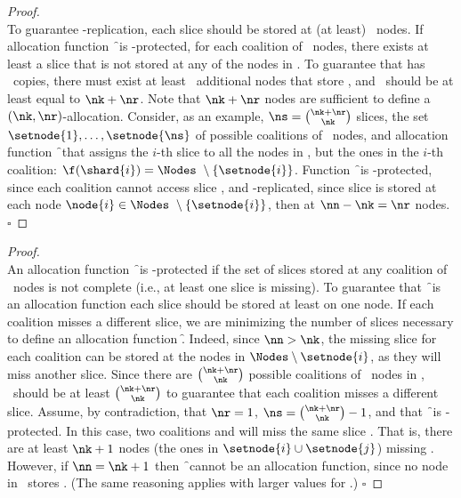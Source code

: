 \begin{proof}
	\hfill\\
	To guarantee \nr-replication, each slice should be stored at
    (at least) \nr\ nodes. If allocation function \f\ is
    \nk-protected, for each coalition  of \nk\ nodes,
    there exists at least a slice  that is not stored at
    any of the nodes in . To guarantee that 
    has \nr\ copies, there must exist at least \nr\ additional
    nodes that store , and \nn\ should be at least equal
    to $\nk + \nr$.  Note that $\nk + \nr$ nodes are sufficient to
    define a $(\nk,\nr)$-allocation.  Consider, as an example,
    $\ns=\binom{\nk+\nr}{\nk}$ slices, the set
    $\setnode{1},\ldots,\setnode{\ns}$ of possible coalitions of
    \nk\ nodes, and allocation function \f\ that assigns the
    $i$-th slice to all the nodes in \Nodes, but the ones in the
    $i$-th coalition: $\f(\shard{i})=\Nodes\ \setminus
    \{\setnode{i}\}$. Function \f\ is \nk-protected, since each
    coalition  cannot access slice , and
    \nr-replicated, since slice  is stored at each node
    $\node{i} \in \Nodes\ \setminus \{\setnode{i}\}$, then at $\nn
    - \nk = \nr$ nodes.
    {\hfill $\square$}
\end{proof}

\medskip

\begin{proof}
	\hfill\\
	An allocation function \f\ is \nk-protected if the set of
    slices stored at any coalition  of \nk\ nodes is
    not complete (i.e., at least one slice is missing). To
    guarantee that \f\ is an allocation function each slice should
    be stored at least on one node. If each coalition misses a
    different slice, we are minimizing the number of slices
    necessary to define an allocation function \f. Indeed, since
    $\nn > \nk$, the missing slice for each coalition 
    can be stored at the nodes in $\Nodes \setminus \setnode{i}$,
    as they will miss another slice. Since there are
    $\binom{\nk+\nr}{\nk}$ possible coalitions of \nk\ nodes in
    \Nodes, \ns\ should be at least $\binom{\nk+\nr}{\nk}$ to
    guarantee that each coalition misses a different slice.
    Assume, by contradiction, that $\nr=1$,
    $\ns=\binom{\nk+\nr}{\nk}-1$, and that \f\ is
    \nk-protected. In this case, two coalitions  and
     will miss the same slice . That is, there
    are at least $\nk+1$ nodes (the ones in $\setnode{i} \cup
    \setnode{j}$) missing . However, if $\nn = \nk +1$
    then \f\ cannot be an allocation function, since no node in
    \Nodes\ stores . (The same reasoning applies with
    larger values for \nr.)
    {\hfill $\square$}
 \end{proof}

